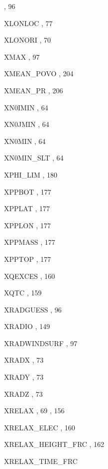\begin{theindex}
    \subitem {},  96
  \item XLONLOC
    \subitem {},  77
  \item XLONORI
    \subitem {},  70
  \item XMAX
    \subitem {},  97
  \item XMEAN\_POVO
    \subitem {},  204
  \item XMEAN\_PR
    \subitem {},  206
  \item XN0IMIN
    \subitem {},  64
  \item XN0JMIN
    \subitem {},  64
  \item XN0MIN
    \subitem {},  64
  \item XN0MIN\_SLT
    \subitem {},  64
  \item XPHI\_LIM
    \subitem {},  180
  \item XPPBOT
    \subitem {},  177
  \item XPPLAT
    \subitem {},  177
  \item XPPLON
    \subitem {},  177
  \item XPPMASS
    \subitem {},  177
  \item XPPTOP
    \subitem {},  177
  \item XQEXCES
    \subitem {},  160
  \item XQTC
    \subitem {},  159
  \item XRADGUESS
    \subitem {},  96
  \item XRADIO 
    \subitem {},  149
  \item XRADWINDSURF
    \subitem {},  97
  \item XRADX
    \subitem {},  73
  \item XRADY
    \subitem {},  73
  \item XRADZ
    \subitem {},  73
  \item XRELAX
    \subitem {},  69
    \subitem {},  156
  \item XRELAX\_ELEC
    \subitem {},  160
  \item XRELAX\_HEIGHT\_FRC
    \subitem {},  162
  \item XRELAX\_TIME\_FRC

\end{theindex}

